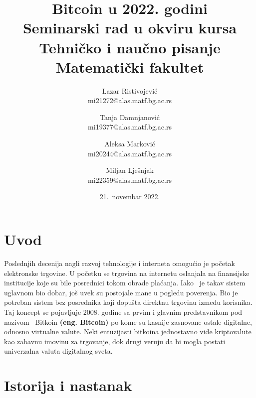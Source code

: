 \documentclass[a4paper]{article}
\begin{document}
\title{Bitcoin u 2022. godini\\ \small{Seminarski rad u okviru kursa\\Tehničko i naučno pisanje\\ Matematički fakultet}}

\author{Lazar Ristivojević\\mi21272@alas.matf.bg.ac.rs\and Tanja Damnjanović\\mi19377@alas.matf.bg.ac.rs\and Aleksa Marković\\mi20244@alas.matf.bg.ac.rs\and Miljan Lješnjak\\mi22359@alas.matf.bg.ac.rs }
\date{21.~novembar 2022.}
\maketitle


\tableofcontents


\newpage

\section{Uvod}
\label{sec:uvod}
Poslednjih decenija nagli razvoj tehnologije i interneta omogućio je početak elektronske trgovine. U početku se trgovina na internetu oslanjala na finansijske institucije koje su bile posrednici tokom obrade plaćanja. Iako  je takav sistem uglavnom bio dobar, još uvek su postojale mane u pogledu poverenja. Bio je potreban sistem bez posrednika koji dopušta direktnu trgovinu između korisnika. Taj koncept se pojavljuje 2008. godine sa prvim i glavnim predstavnikom pod nazivom  Bitkoin \textbf{(eng. Bitcoin)} po kome su kasnije zasnovane ostale digitalne, odnosno virtualne valute. Neki entuzijasti bitkoina jednostavno vide kriptovalute kao zabavnu imovinu za trgovanje, dok drugi veruju da bi mogla postati univerzalna valuta digitalnog sveta.
\\

\section{Istorija i nastanak}
\end{document}
